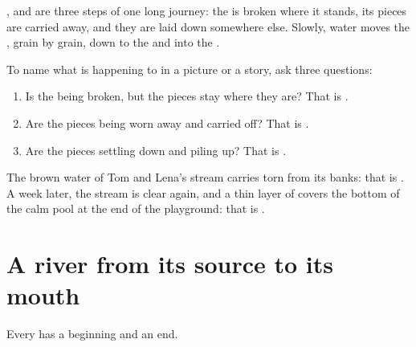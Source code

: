 ,  and  are three steps of one long journey:
the  is broken where it stands, its pieces are carried away, and they
are laid down somewhere else. Slowly, water moves the , grain by
grain, down to the  and into the .

\begin{method}\label{met:g5:water-shapes-the-land:naming}
To name what is happening to  in a picture or a story, ask three
questions:
\begin{enumerate}
  \item Is the  being broken, but the pieces stay where they are?
        That is \emph{}.
  \item Are the pieces being worn away and carried off? That is
        \emph{}.
  \item Are the pieces settling down and piling up? That is
        \emph{}.
\end{enumerate}
\end{method}

\begin{example}\label{ex:g5:water-shapes-the-land:stream}
The brown water of Tom and Lena's stream carries  torn from its banks:
that is . A week later, the stream is clear again, and a thin layer
of  covers the bottom of the calm pool at the end of the playground:
that is .
\end{example}

\section{A river from its source to its mouth}

Every  has a beginning and an end.

